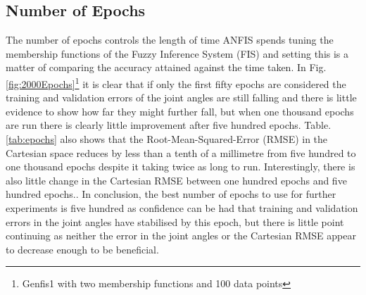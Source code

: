 \documentclass[11.5pt, twoside, a4paper]{article}
\begin{document}
\begin{table}
\begin{center}
\caption{Results from changing range of $\theta_3$. \label{tab:range}}\end{center}
\end{table}


\subsection{Number of Epochs}
The number of epochs controls the length of time ANFIS spends tuning the membership functions of the Fuzzy Inference System (FIS) and setting this is a matter of comparing the accuracy attained against the time taken. In Fig.\ref{fig:2000Epochs}\footnote{Genfis1 with two membership functions and 100 data points} it is clear that if only the first fifty epochs are considered the training and validation errors of the joint angles are still falling and there is little evidence to show how far they might further fall, but when one thousand epochs are run there is clearly little improvement after five hundred epochs. Table.\ref{tab:epochs} also shows that the Root-Mean-Squared-Error (RMSE) in the Cartesian space reduces by less than a tenth of a millimetre from five hundred to one thousand epochs despite it taking twice as long to run. Interestingly, there is also little change in the Cartesian RMSE between one hundred epochs and five hundred epochs.. In conclusion, the best number of epochs to use for further experiments is five hundred as confidence can be had that training and validation errors in the joint angles have stabilised by this epoch, but there is little point continuing as neither the error in the joint angles or the Cartesian RMSE appear to decrease enough to be beneficial.
\end{document}
